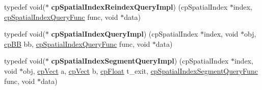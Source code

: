 \begin{DoxyCompactItemize}
\item 
\hypertarget{group__cp_spatial_index_gad1b5f2682c09f5f4e5e48f751e8e25b6}{}typedef void($\ast$ {\bfseries cp\+Spatial\+Index\+Reindex\+Query\+Impl}) (cp\+Spatial\+Index $\ast$index, \hyperlink{group__cp_spatial_index_ga7bcf80d017b29d32d9f8011405b241f9}{cp\+Spatial\+Index\+Query\+Func} func, void $\ast$data)\label{group__cp_spatial_index_gad1b5f2682c09f5f4e5e48f751e8e25b6}

\item 
\hypertarget{group__cp_spatial_index_ga15683b78b71535766a2e69d203196549}{}typedef void($\ast$ {\bfseries cp\+Spatial\+Index\+Query\+Impl}) (cp\+Spatial\+Index $\ast$index, void $\ast$obj, \hyperlink{structcp_b_b}{cp\+B\+B} bb, \hyperlink{group__cp_spatial_index_ga7bcf80d017b29d32d9f8011405b241f9}{cp\+Spatial\+Index\+Query\+Func} func, void $\ast$data)\label{group__cp_spatial_index_ga15683b78b71535766a2e69d203196549}

\item 
\hypertarget{group__cp_spatial_index_gab91c6534f37f1a493c58934417b16f09}{}typedef void($\ast$ {\bfseries cp\+Spatial\+Index\+Segment\+Query\+Impl}) (cp\+Spatial\+Index $\ast$index, void $\ast$obj, \hyperlink{structcp_vect}{cp\+Vect} a, \hyperlink{structcp_vect}{cp\+Vect} b, \hyperlink{group__basic_types_gac1ed65573e035bf892505768c852d8d3}{cp\+Float} t\+\_\+exit, \hyperlink{group__cp_spatial_index_ga829ef5f6fd840ea31370d53db9045373}{cp\+Spatial\+Index\+Segment\+Query\+Func} func, void $\ast$data)\label{group__cp_spatial_index_gab91c6534f37f1a493c58934417b16f09}

\end{DoxyCompactItemize}
